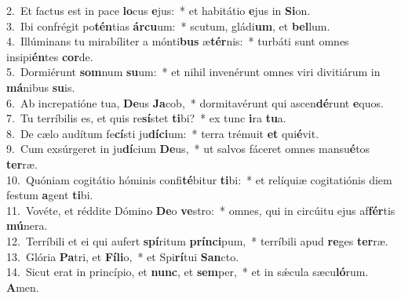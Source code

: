 {2.~}Et factus est in pace \textbf{lo}cus \textbf{e}jus:~* et habitátio \textbf{e}jus in \textbf{Si}on.\\
{3.~}Ibi confrégit po\textbf{tén}tias \textbf{ár}\textbf{cu}um:~* scutum, gládi\textbf{um}, et \textbf{bel}lum.\\
{4.~}Illúminans tu mirabíliter a mónti\textbf{bus} æ\textbf{tér}nis:~* turbáti sunt omnes insipi\textbf{én}tes \textbf{cor}de.\\
{5.~}Dormiérunt \textbf{som}num \textbf{su}um:~* et nihil invenérunt omnes viri divitiárum in \textbf{má}nibus \textbf{su}is.\\
{6.~}Ab increpatióne tua, \textbf{De}us \textbf{Ja}cob,~* dormitavérunt qui ascen\textbf{dé}runt \textbf{e}quos.\\
{7.~}Tu terríbilis es, et quis re\textbf{sí}stet \textbf{ti}bi?~* ex tunc \textbf{i}ra \textbf{tu}a.\\
{8.~}De cælo audítum fe\textbf{cí}sti ju\textbf{dí}\textbf{ci}um:~* terra trémuit \textbf{et} qui\textbf{é}vit.\\
{9.~}Cum exsúrgeret in ju\textbf{dí}cium \textbf{De}us,~* ut salvos fáceret omnes mansu\textbf{é}tos \textbf{ter}ræ.\\
{10.~}Quóniam cogitátio hóminis confi\textbf{té}bitur \textbf{ti}bi:~* et relíquiæ cogitatiónis diem festum \textbf{a}gent \textbf{ti}bi.\\
{11.~}Vovéte, et réddite Dómino \textbf{De}o \textbf{ve}stro:~* omnes, qui in circúitu ejus af\textbf{fér}tis \textbf{mú}nera.\\
{12.~}Terríbili et ei qui aufert \textbf{spí}ritum \textbf{prín}\textbf{ci}pum,~* terríbili apud \textbf{re}ges \textbf{ter}ræ.\\
{13.~}Glória \textbf{Pa}tri, et \textbf{Fí}\textbf{li}o,~* et Spi\textbf{rí}tui \textbf{San}cto.\\
{14.~}Sicut erat in princípio, et \textbf{nunc}, et \textbf{sem}per,~* et in sǽcula sæcu\textbf{ló}rum. \textbf{A}men.\\
